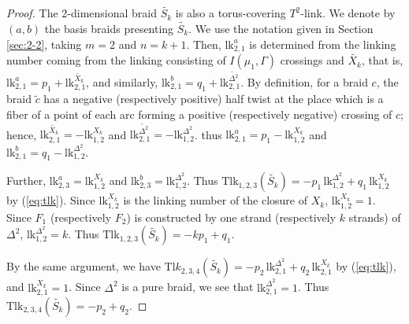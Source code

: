 \documentclass[a4paper,11pt]{amsart}
\numberwithin{equation}{section}
\begin{document}
\begin{proof}
The 2-dimensional braid $\widetilde{S_k}$ is also a torus-covering $T^2$-link. 
We denote by $(a, b)$ the basis braids presenting $\widetilde{S_k}$. 
We use the notation given in Section \ref{sec:2-2}, taking $m=2$ and $n=k+1$. 
Then, $\mathrm{lk}_{2,1}^a$ is determined from the linking number coming from the linking consisting of $I(\mu_1, \Gamma)$ crossings and $\widetilde{X_k}$, that is, 
$\mathrm{lk}_{2,1}^a=p_1+\mathrm{lk}_{2,1}^{\widetilde{X_k}}$,  and similarly, 
$\mathrm{lk}_{2,1}^b=q_1+\mathrm{lk}_{2,1}^{\widetilde{\Delta^2}}$. 
By definition, for a braid $c$, the braid $\widetilde{c}$ has a negative (respectively positive) half twist at the place which is a fiber of a point of each arc forming a positive (respectively negative) crossing of $c$; hence, $\mathrm{lk}_{2,1}^{\widetilde{X_k}}=-\mathrm{lk}_{1,2}^{X_k}$ and  
$\mathrm{lk}_{2,1}^{\widetilde{\Delta^2}}=-\mathrm{lk}_{1,2}^{\Delta^2}$. 
thus 
$\mathrm{lk}_{2,1}^a=p_1-\mathrm{lk}_{1,2}^{X_k}$ and 
$\mathrm{lk}_{2,1}^b=q_1-\mathrm{lk}_{1,2}^{\Delta^2}$. 

Further, $\mathrm{lk}_{2,3}^{a}=\mathrm{lk}_{1,2}^{X_k}$ and $\mathrm{lk}_{2,3}^b=\mathrm{lk}_{1,2}^{\Delta^2}$. 
Thus $\mathrm{Tlk}_{1,2,3}(\widetilde{S_k})=-p_1\, \mathrm{lk}_{1,2}^{\Delta^2}+q_1\, \mathrm{lk}_{1,2}^{X_k}$ by (\ref{eq:tlk}). 
Since $\mathrm{lk}_{1,2}^{X_k}$ is the linking number of the closure of $X_k$, $\mathrm{lk}_{1,2}^{X_k}=1$. 
Since $F_1$ (respectively $F_2$) is constructed by one strand (respectively $k$ strands) of $\Delta^2$, $\mathrm{lk}_{1,2}^{\Delta^2}=k$. 
Thus $\mathrm{Tlk}_{1,2,3}(\widetilde{S_k})=-k p_1 +q_1$. 

By the same argument, we have 
$\mathrm{Tl}k_{2,3,4}(\widetilde{S_k})=-p_2\, \mathrm{lk}_{2,1}^{\Delta^2}+q_2 \,\mathrm{lk}_{2,1}^{X_k}$ by (\ref{eq:tlk}), and $\mathrm{lk}_{2,1}^{X_k}=1$. 
Since $\Delta^2$ is a pure braid, we see that $\mathrm{lk}_{2,1}^{\Delta^2}=1$. 
Thus $\mathrm{Tlk}_{2,3,4}(\widetilde{S_k})=-p_2+q_2$. 
\end{proof}
\end{document}
